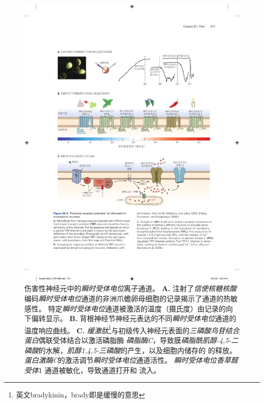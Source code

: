 \begin{figure}[htbp]
	\centering
	\includegraphics[width=1.0\linewidth]{chap20/fig_20_2}
	\caption{伤害性神经元中的\textit{瞬时受体电位}离子通道。
		\textbf{A.} 注射了\textit{信使核糖核酸}编码\textit{瞬时受体电位}通道的非洲爪蟾卵母细胞的记录揭示了通道的热敏感性。
		特定\textit{瞬时受体电位}通道被激活的温度（摄氏度）由记录的向下偏转显示\cite{tominaga2004thermosensation}。
		\textbf{B.} 背根神经节神经元表达的不同\textit{瞬时受体电位}通道的温度响应曲线\cite{jordt2003lessons}。
		\textbf{C.} \textit{缓激肽}\footnote{英文bradykinin，brady即是缓慢的意思}与初级传入神经元表面的\textit{三磷酸鸟苷结合蛋白}偶联受体结合以激活磷脂酶 \textit{磷脂酶C}，导致膜\textit{磷脂酰肌醇-4,5-二磷酸}的水解，\textit{肌醇1,4,5-三磷酸}的产生，以及细胞内储存的  的释放。
		\textit{蛋白激酶C}的激活调节\textit{瞬时受体电位}通道活性。 
		\textit{瞬时受体电位香草醛受体}1 通道被敏化，导致通道打开和  流入\cite{bautista2006trpa1}。}
	\label{fig:20_2}
\end{figure}


